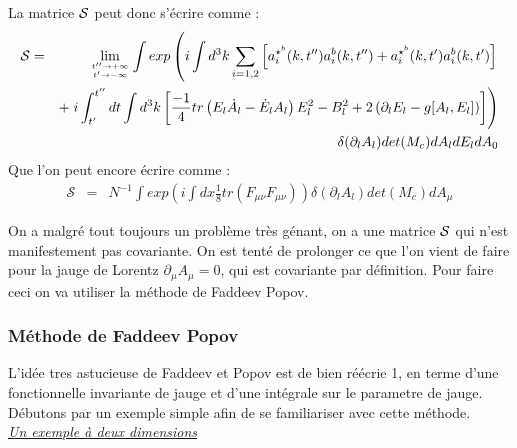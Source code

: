 \documentclass[a4paper,11pt]{article}
\theoremstyle{plain}
\theoremstyle{definition}
\theoremstyle{remark}
\numberwithin{equation}{section}
\numberwithin{equation}{subsection}
\numberwithin{figure}{section}
\begin{document}
\noindent
La matrice $\cal{S}$ peut donc s'écrire comme :
\begin{eqnarray}
 \mathcal{S} &=& \lim_{t'' \to + \infty \atop t' \to - \infty}
\int exp \left( 
i \int d^{3}k \sum_{i=1,2} \left[ a^{\star^{b}}_{i}(k,t'') a^{b}_{i}(k,t'') + a^{\star^{b}}_{i}(k,t') a^{b}_{i}(k,t') \right] \right. \nonumber \\ 
&& + \left. i \int^{t''}_{t'} dt \int d^{3}k 
\left[ \frac{-1}{4} tr\left(E_{l} \dot{A}_{l} - \dot{E}_{l} A_{l} \right) E^{2}_{l} - B^{2}_{l} 
+ 2 \left( \partial_{l} E_{l} - g [A_{l} , E_{l} ] \right) \right]
\right) \nonumber \\
&& \delta( \partial_{l}A_{l} ) det(M_{c}) dA_{l} dE_{l} dA_{0}
\end{eqnarray} 
Que l'on peut encore écrire comme :
\begin{eqnarray}
 \mathcal{S} &=& N^{-1} \int exp \left( 
i \int dx \frac{1}{8} tr \left( F_{\mu\nu} F_{\mu\nu} \right) \right) 
\delta( \partial_{l}A_{l} ) det(M_{c}) dA_{\mu}
\end{eqnarray} 
 
\noindent
On a malgré tout toujours un problème très génant, on a une matrice $\cal{S}$  qui n'est manifestement pas covariante. On est tenté de prolonger 
ce que l'on vient de faire pour la jauge de Lorentz $\partial_{\mu} A_{\mu}=0$, qui est covariante par définition. Pour faire ceci on va utiliser 
la méthode de Faddeev Popov.

\subsubsection{Méthode de Faddeev Popov}

\noindent
L'idée tres astucieuse de Faddeev et Popov est de bien réécrie  1, en terme d'une fonctionnelle invariante de jauge et d'une intégrale sur 
le parametre de jauge.\\
Débutons par un exemple simple afin de se familiariser avec cette méthode. \\

\noindent
\textit{\underline{Un exemple à deux dimensions}}\\
\end{document}
